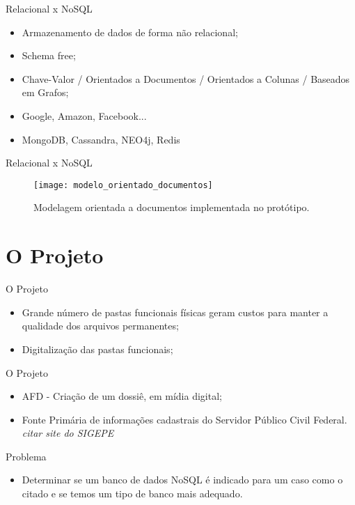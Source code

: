 \begin{frame}{Relacional x NoSQL}
    \begin{itemize}
    \item Armazenamento de dados de forma não relacional;
    \item Schema free;
    \item Chave-Valor / Orientados a Documentos / Orientados a Colunas / Baseados em Grafos;
    \item Google, Amazon, Facebook...
    \item MongoDB, Cassandra, NEO4j, Redis
    \end{itemize}
\end{frame}

\begin{frame}{Relacional x NoSQL}
	\begin{figure}[!htbp]
		\begin{center}
			\texttt{[image: modelo\_orientado\_documentos]}
		\end{center}
		\caption{ Modelagem orientada a documentos implementada no protótipo.}
		\label{fig:modeloorientadodocumentos}
	\end{figure}
\end{frame}

\section{O Projeto}

\begin{frame}{O Projeto}
    \begin{itemize}
	\item Grande número de pastas funcionais físicas geram custos para manter a qualidade dos arquivos permanentes;
	\item Digitalização das pastas funcionais;
    \end{itemize}
\end{frame}

\begin{frame}{O Projeto}
    \begin{itemize}
	\item AFD - Criação de um dossiê, em mídia digital;
	\item Fonte Primária de informações cadastrais do Servidor Público Civil Federal. \textit{citar site do SIGEPE}
    \end{itemize}
\end{frame}

\begin{frame}{Problema}
    \begin{itemize}
           \item Determinar se um banco de dados NoSQL é indicado para um caso como o citado e se temos um tipo de banco mais adequado.
    \end{itemize}
\end{frame}


